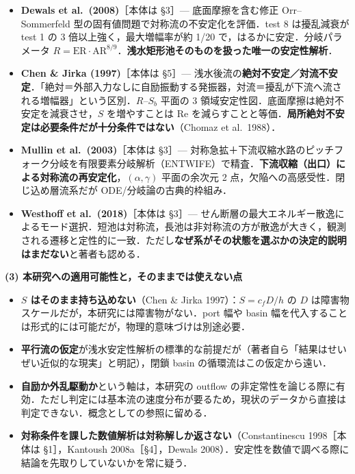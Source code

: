 \documentclass[11pt]{jsarticle}
\begin{document}
\begin{itemize}
  \item \textbf{Dewals et al.\ (2008)}［本体は §3］— 底面摩擦を含む修正 Orr--Sommerfeld 型の固有値問題で対称流の不安定化を評価．test 8 は擾乱減衰が test 1 の 3 倍以上強く，最大増幅率が約 1/20 で，はるかに安定．分岐パラメータ $R = \mathrm{ER} \cdot \mathrm{AR}^{8/9}$．\textbf{浅水矩形池そのものを扱った唯一の安定性解析}．
  \item \textbf{Chen \& Jirka (1997)}［本体は §5］— 浅水後流の\textbf{絶対不安定／対流不安定}．「絶対＝外部入力なしに自励振動する発振器，対流＝擾乱が下流へ流される増幅器」という区別．$R$--$S_b$ 平面の 3 領域安定性図．底面摩擦は絶対不安定を減衰させ，$S$ を増やすことは $\mathrm{Re}$ を減らすことと等価．\textbf{局所絶対不安定は必要条件だが十分条件ではない}（Chomaz et al.\ 1988）．
  \item \textbf{Mullin et al.\ (2003)}［本体は §3］— 対称急拡＋下流収縮水路のピッチフォーク分岐を有限要素分岐解析（ENTWIFE）で精査．\textbf{下流収縮（出口）による対称流の再安定化}，$(\alpha, \gamma)$ 平面の余次元 2 点，欠陥への高感受性．閉じ込め層流系だが ODE/分岐論の古典的枠組み．
  \item \textbf{Westhoff et al.\ (2018)}［本体は §3］— せん断層の最大エネルギー散逸によるモード選択．短池は対称流，長池は非対称流の方が散逸が大きく，観測される遷移と定性的に一致．ただし\textbf{なぜ系がその状態を選ぶかの決定的説明はまだない}と著者も認める．
\end{itemize}

\medskip
\noindent\textbf{(3) 本研究への適用可能性と，そのままでは使えない点}

\begin{itemize}
  \item \textbf{$S$ はそのまま持ち込めない}（Chen \& Jirka 1997）：$S = c_f D/h$ の $D$ は障害物スケールだが，本研究には障害物がない．port 幅や basin 幅を代入することは形式的には可能だが，物理的意味づけは別途必要．
  \item \textbf{平行流の仮定}が浅水安定性解析の標準的な前提だが（著者自ら「結果はせいぜい近似的な現実」と明記），閉鎖 basin の循環流はこの仮定から遠い．
  \item \textbf{自励か外乱駆動か}という軸は，本研究の outflow の非定常性を論じる際に有効．ただし判定には基本流の速度分布が要るため，現状のデータから直接は判定できない．概念としての参照に留める．
  \item \textbf{対称条件を課した数値解析は対称解しか返さない}（Constantinescu 1998［本体は §1］，Kantoush 2008a［§4］，Dewals 2008）．安定性を数値で調べる際に結論を先取りしていないかを常に疑う．
\end{itemize}
\end{document}
